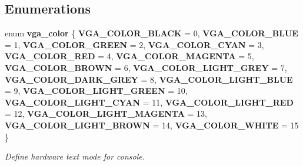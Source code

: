 \subsection*{Enumerations}
\begin{DoxyCompactItemize}
\item 
enum \textbf{ vga\+\_\+color} \{ \newline
{\bfseries V\+G\+A\+\_\+\+C\+O\+L\+O\+R\+\_\+\+B\+L\+A\+CK} = 0, 
{\bfseries V\+G\+A\+\_\+\+C\+O\+L\+O\+R\+\_\+\+B\+L\+UE} = 1, 
{\bfseries V\+G\+A\+\_\+\+C\+O\+L\+O\+R\+\_\+\+G\+R\+E\+EN} = 2, 
{\bfseries V\+G\+A\+\_\+\+C\+O\+L\+O\+R\+\_\+\+C\+Y\+AN} = 3, 
\newline
{\bfseries V\+G\+A\+\_\+\+C\+O\+L\+O\+R\+\_\+\+R\+ED} = 4, 
{\bfseries V\+G\+A\+\_\+\+C\+O\+L\+O\+R\+\_\+\+M\+A\+G\+E\+N\+TA} = 5, 
{\bfseries V\+G\+A\+\_\+\+C\+O\+L\+O\+R\+\_\+\+B\+R\+O\+WN} = 6, 
{\bfseries V\+G\+A\+\_\+\+C\+O\+L\+O\+R\+\_\+\+L\+I\+G\+H\+T\+\_\+\+G\+R\+EY} = 7, 
\newline
{\bfseries V\+G\+A\+\_\+\+C\+O\+L\+O\+R\+\_\+\+D\+A\+R\+K\+\_\+\+G\+R\+EY} = 8, 
{\bfseries V\+G\+A\+\_\+\+C\+O\+L\+O\+R\+\_\+\+L\+I\+G\+H\+T\+\_\+\+B\+L\+UE} = 9, 
{\bfseries V\+G\+A\+\_\+\+C\+O\+L\+O\+R\+\_\+\+L\+I\+G\+H\+T\+\_\+\+G\+R\+E\+EN} = 10, 
{\bfseries V\+G\+A\+\_\+\+C\+O\+L\+O\+R\+\_\+\+L\+I\+G\+H\+T\+\_\+\+C\+Y\+AN} = 11, 
\newline
{\bfseries V\+G\+A\+\_\+\+C\+O\+L\+O\+R\+\_\+\+L\+I\+G\+H\+T\+\_\+\+R\+ED} = 12, 
{\bfseries V\+G\+A\+\_\+\+C\+O\+L\+O\+R\+\_\+\+L\+I\+G\+H\+T\+\_\+\+M\+A\+G\+E\+N\+TA} = 13, 
{\bfseries V\+G\+A\+\_\+\+C\+O\+L\+O\+R\+\_\+\+L\+I\+G\+H\+T\+\_\+\+B\+R\+O\+WN} = 14, 
{\bfseries V\+G\+A\+\_\+\+C\+O\+L\+O\+R\+\_\+\+W\+H\+I\+TE} = 15
 \}\begin{DoxyCompactList}\small\item\em Define hardware text mode for console. \end{DoxyCompactList}
\end{DoxyCompactItemize}

